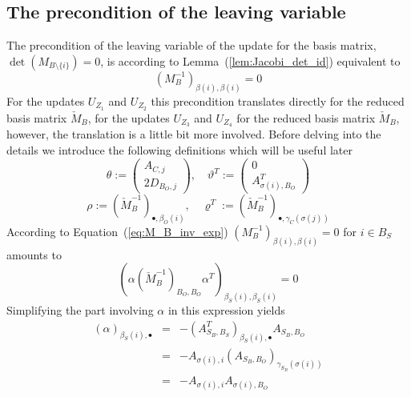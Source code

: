 \documentclass[a4paper]{article}
\begin{document}
\subsection{The precondition of the leaving variable}
The precondition of the leaving variable of the update for the basis matrix, 
$\det(M_{B\setminus \{i\}})=0$, is
according to Lemma~(\ref{lem:Jacobi_det_id}) equivalent to 
\begin{equation}
\label{precond:leaving} 
\left(M_{B}^{-1}\right)_{\beta(i),\beta(i)}=0
\end{equation}
For the updates $U_{Z_{1}}$ and $U_{Z_{2}}$ this precondition translates
directly for the reduced basis
matrix $\check{M}_{B}$, for the updates $U_{Z_{3}}$ and $U_{Z_{4}}$ for the
reduced basis matrix $\check{M}_{B}$, however, the translation is a little bit
more involved. Before delving into the details we introduce the following
definitions which will be useful later
\begin{equation}
\label{def:theta_vartheta}
\theta :=
\left(
\begin{array}{c}
A_{C, j} \\
\hline
2D_{B_{O}, j}
\end{array}
\right),
\quad
\vartheta^{T}:=
\left(
\begin{array}{c}
0 \\
\hline
A_{\sigma(i), B_{O}}^{T}
\end{array}
\right)
\end{equation}
\begin{equation}
\label{def:rho_varrho}
\rho:=
\left(\check{M}_{B}^{-1}\right)_{\bullet, \beta_{O}(i)},
\quad
\varrho^{T}:=
\left(\check{M}_{B}^{-1}\right)_{\bullet, \gamma_{C}(\sigma(j))}
\end{equation}
According to Equation~(\ref{eq:M_B_inv_exp})
$\left(M_{B}^{-1}\right)_{\beta(i),\beta(i)}=0$
for $i \in B_{S}$ amounts to
\begin{equation}
\label{eq:precond}
\left(\alpha\left(\check{M}_{B}^{-1}\right)_{B_{O}, B_{O}}
    \alpha^{T}\right)_{\beta_{S}(i), \beta_{S}(i)} = 0
\end{equation}
Simplifying the part involving $\alpha$ in this expression yields
\begin{eqnarray*}
\left(\alpha\right)_{\beta_{S}(i), \bullet} &=&
-\left(A_{S_{B}, B_{S}}^{T}\right)_{\beta_{S}(i), \bullet}A_{S_{B}, B_{O}} \\
&=&
-A_{\sigma(i),i}\left(A_{S_{B},B_{O}}\right)_{\gamma_{S_{B}}(\sigma(i))} \\
&=&
-A_{\sigma(i),i}A_{\sigma(i),B_{O}}
\end{eqnarray*}
\end{document}
